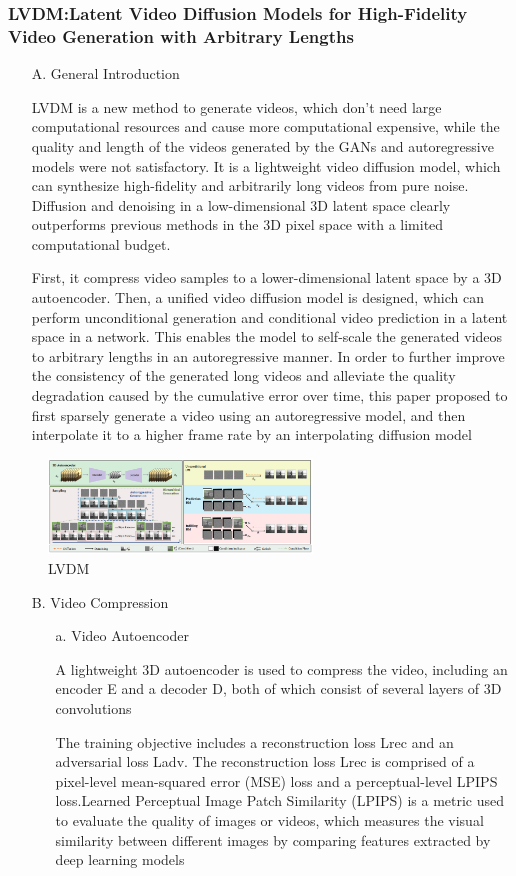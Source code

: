 \documentclass[lettersize,journal]{IEEEtran}
\begin{document}
\subsubsection{LVDM:Latent Video Diffusion Models for High-Fidelity Video Generation with Arbitrary Lengths}
\begin{enumerate}
    \item[A.]General Introduction

    LVDM is a new method to generate videos, which don't need large computational resources and cause more computational expensive, while the quality and length of the videos generated by the GANs and autoregressive models were not satisfactory. It is a lightweight video diffusion model, which can synthesize high-fidelity and arbitrarily long videos from pure noise. Diffusion and denoising in a low-dimensional 3D latent space clearly outperforms previous methods in the 3D pixel space with a limited computational budget.

    First, it compress video samples to a lower-dimensional latent space by a 3D autoencoder. Then, a unified video diffusion model is designed, which can perform unconditional generation and conditional video prediction in a latent space in a network. This enables the model to self-scale the generated videos to arbitrary lengths in an autoregressive manner. In order to further improve the consistency of the generated long videos and alleviate the quality degradation caused by the cumulative error over time, this paper proposed to first sparsely generate a video using an autoregressive model, and then interpolate it to a higher frame rate by an interpolating diffusion model
\end{enumerate}
\begin{figure}[h!]
    \centering
    \includegraphics[width=7cm]{Image/LVDM Method.jpg}
    \caption{LVDM}
    \label{fig-sample}
\end{figure}
\begin{enumerate}
    \item[B.]Video Compression
    \begin{enumerate}
        \item[a.]Video Autoencoder
        
        A lightweight 3D autoencoder is used to compress the video, including an encoder E and a decoder D, both of which consist of several layers of 3D convolutions	
    
        The training objective includes a reconstruction loss Lrec and an adversarial loss Ladv. The reconstruction loss Lrec is comprised of a pixel-level mean-squared error (MSE) loss and a perceptual-level LPIPS loss.Learned Perceptual Image Patch Similarity (LPIPS) is a metric used to evaluate the quality of images or videos, which measures the visual similarity between different images by comparing features extracted by deep learning models
    \end{enumerate}
\end{enumerate}
\end{document}
